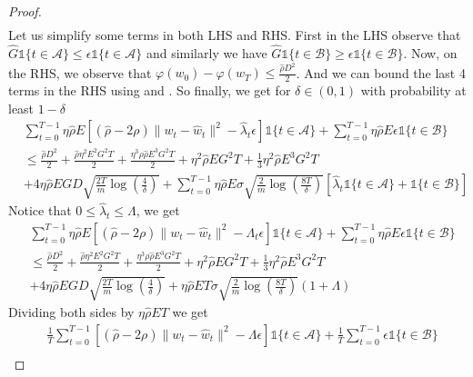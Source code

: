 \documentclass{article} %
\def\A{{\mathcal A}}
\def\B{{\mathcal B}}
\begin{document}
\begin{proof}
\begin{align*}
    \end{align*}
    Let us simplify some terms in both LHS and RHS. First in the LHS observe that $\hat{G}\mathds{1}\{t \in \A\} \leq \epsilon\mathds{1}\{t \in \A\}$ and similarly we have $\hat{G}\mathds{1}\{t \in \B\} \geq \epsilon\mathds{1}\{t \in \B\}$. Now, on the RHS, we observe that $\varphi(w_0) - \varphi(w_T) \leq \frac{\hat{\rho}D^2}{2}$. And we can bound the last 4 terms in the RHS using  and . So finally, we get for $\delta \in (0,1)$ with probability at least $1-\delta$
    \begin{align*}
        &\sum_{t=0}^{T-1}\eta \hat{\rho} E[(\hat{\rho}-2\rho)\|w_t - \hat{w}_t\|^2 - \hat{\lambda}_t \epsilon]\mathds{1}\{t \in \A\} + \sum_{t=0}^{T-1}\eta \hat{\rho} E \epsilon \mathds{1}\{t \in \B\}  
        \\
        & \leq \frac{\hat{\rho}D^2}{2} + \frac{\hat{\rho}\eta^2 E^2 G^2 T}{2} + \frac{\eta^3 \rho \hat{\rho} E^3 G^2 T}{2} + \eta^2 \hat{\rho} E G^2 T + \frac{1}{3}\eta^2 \hat{\rho} E^3 G^2 T
        \\
        & + 4\eta \hat{\rho} EGD\sqrt{\frac{2T}{m}\log(\frac{4}{\delta})}
         + \sum_{t = 0}^{T-1}\eta \hat{\rho} E \sigma\sqrt{\frac{2}{m} \log\left(\frac{8T}{\delta}\right)}\left[\hat{\lambda}_t\mathds{1}\{t \in \A\} + \mathds{1}\{t \in \B\} \right]
    \end{align*}
    Notice that $0 \leq \hat{\lambda}_t \leq \Lambda$, we get
    \begin{align*}
        &\sum_{t=0}^{T-1}\eta \hat{\rho} E[(\hat{\rho}-2\rho)\|w_t - \hat{w}_t\|^2 - {\Lambda}_t \epsilon]\mathds{1}\{t \in \A\} + \sum_{t=0}^{T-1}\eta \hat{\rho} E \epsilon \mathds{1}\{t \in \B\}
        \\
        & \leq \frac{\hat{\rho}D^2}{2} + \frac{\hat{\rho}\eta^2 E^2 G^2 T}{2} + \frac{\eta^3 \rho \hat{\rho} E^3 G^2 T}{2} + \eta^2 \hat{\rho} E G^2 T + \frac{1}{3}\eta^2 \hat{\rho} E^3 G^2 T
        \\
        & + 4\eta \hat{\rho} EGD\sqrt{\frac{2T}{m}\log(\frac{4}{\delta})}
        + \eta \hat{\rho} E T \sigma\sqrt{\frac{2}{m} \log\left(\frac{8T}{\delta}\right)}(1 + \Lambda)
    \end{align*}
    Dividing both sides by $\eta \hat{\rho} ET$ we get
    \begin{align*}
        &\frac{1}{T}\sum_{t=0}^{T-1}[(\hat{\rho}-2\rho)\|w_t - \hat{w}_t\|^2 - {\Lambda} \epsilon]\mathds{1}\{t \in \A\} + \frac{1}{T}\sum_{t=0}^{T-1} \epsilon \mathds{1}\{t \in \B\}  
        \\

\end{align*}
\end{proof}
\end{document}
